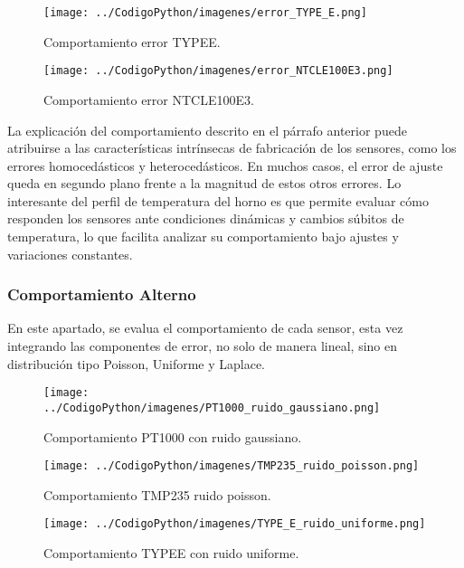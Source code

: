 \documentclass[conference]{IEEEtran}
\begin{document}
\begin{figure}[h!]
	\centering
	\texttt{[image: ../CodigoPython/imagenes/error\_TYPE\_E.png]}
	\caption{Comportamiento error TYPEE.}
	\label{fig:error_TYPE_E}
\end{figure}

\begin{figure}[h!]
	\centering
	\texttt{[image: ../CodigoPython/imagenes/error\_NTCLE100E3.png]}
	\caption{Comportamiento error NTCLE100E3.}
	\label{fig:error_NTCLE100E3}
\end{figure}

La explicación del comportamiento descrito en el párrafo anterior puede atribuirse a las características intrínsecas de fabricación de los sensores, como los errores homocedásticos y heterocedásticos. En muchos casos, el error de ajuste queda en segundo plano frente a la magnitud de estos otros errores. Lo interesante del perfil de temperatura del horno es que permite evaluar cómo responden los sensores ante condiciones dinámicas y cambios súbitos de temperatura, lo que facilita analizar su comportamiento bajo ajustes y variaciones constantes.




\subsubsection{Comportamiento Alterno}

En este apartado, se evalua el comportamiento de cada sensor, esta vez integrando las componentes de error, no solo de manera lineal, sino en distribución tipo Poisson, Uniforme y Laplace.

\begin{figure}[h!]
	\centering
	\texttt{[image: ../CodigoPython/imagenes/PT1000\_ruido\_gaussiano.png]}
	\caption{Comportamiento PT1000 con ruido gaussiano.}
	\label{fig:PT1000_ruido_gaussiano}
\end{figure}

\begin{figure}[h!]
	\centering
	\texttt{[image: ../CodigoPython/imagenes/TMP235\_ruido\_poisson.png]}
	\caption{Comportamiento TMP235 ruido poisson.}
	\label{fig:TMP235_ruido_poisson}
\end{figure}

\begin{figure}[h!]
	\centering
	\texttt{[image: ../CodigoPython/imagenes/TYPE\_E\_ruido\_uniforme.png]}
	\caption{Comportamiento TYPEE con ruido uniforme.}
	\label{fig:TYPE_E_ruido_uniforme}
\end{figure}
\end{document}
